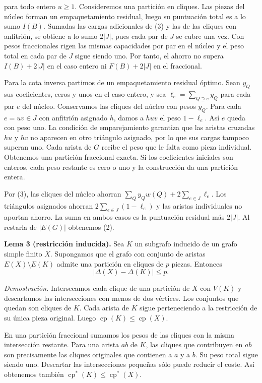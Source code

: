 \documentclass[spanish,11pt,a4paper]{article}
\begin{document}
para todo entero \(u\ge1\). Consideremos una partición en cliques. Las piezas del núcleo forman un empaquetamiento residual, luego su puntuación total es a lo sumo \(I(B)\). Sumadas las cargas adicionales de (3) y las de las cliques con anfitrión, se obtiene a lo sumo \(2|J|\), pues cada par de \(J\) se cubre una vez. Con pesos fraccionales rigen las mismas capacidades por par en el núcleo y el peso total en cada par de \(J\) sigue siendo uno. Por tanto, el ahorro no supera \(I(B)+2|J|\) en el caso entero ni \(F(B)+2|J|\) en el fraccional.

Para la cota inversa partimos de un empaquetamiento residual óptimo. Sean \(y_Q\) sus coeficientes, ceros y unos en el caso entero, y sea \(\ell_e=\sum_{Q\supseteq e}y_Q\) para cada par \(e\) del núcleo. Conservamos las cliques del núcleo con pesos \(y_Q\). Para cada \(e=uv\in J\) con anfitrión asignado \(h\), damos a \(huv\) el peso \(1-\ell_e\). Así \(e\) queda con peso uno. La condición de emparejamiento garantiza que las aristas cruzadas \(hu\) y \(hv\) no aparecen en otro triángulo asignado, por lo que sus cargas tampoco superan uno. Cada arista de \(G\) recibe el peso que le falta como pieza individual. Obtenemos una partición fraccional exacta. Si los coeficientes iniciales son enteros, cada peso restante es cero o uno y la construcción da una partición entera.

Por (3), las cliques del núcleo ahorran \(\sum_Q y_Qw(Q)+2\sum_{e\in J}\ell_e\). Los triángulos asignados ahorran \(2\sum_{e\in J}(1-\ell_e)\) y las aristas individuales no aportan ahorro. La suma en ambos casos es la puntuación residual más \(2|J|\). Al restarla de \(|E(G)|\) obtenemos (2).

\textbf{Lema 3 (restricción inducida).} Sea \(K\) un subgrafo inducido de un grafo simple finito \(X\). Supongamos que el grafo con conjunto de aristas \(E(X)\setminus E(K)\) admite una partición en cliques de \(p\) piezas. Entonces
\[
|\Delta(X)-\Delta(K)|\le p. \tag{4}
\]

\emph{Demostración.} Intersecamos cada clique de una partición de \(X\) con \(V(K)\) y descartamos las intersecciones con menos de dos vértices. Los conjuntos que quedan son cliques de \(K\). Cada arista de \(K\) sigue perteneciendo a la restricción de su única pieza original. Luego \(\operatorname{cp}(K)\le\operatorname{cp}(X)\).

En una partición fraccional sumamos los pesos de las cliques con la misma intersección restante. Para una arista \(ab\) de \(K\), las cliques que contribuyen en \(ab\) son precisamente las cliques originales que contienen a \(a\) y a \(b\). Su peso total sigue siendo uno. Descartar las intersecciones pequeñas sólo puede reducir el coste. Así obtenemos también \(\operatorname{cp}^{\ast}(K)\le\operatorname{cp}^{\ast}(X)\).
\end{document}
